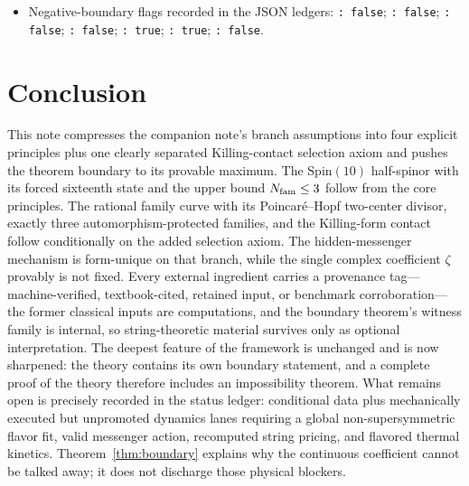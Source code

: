 \documentclass[
  aps,
  prd,
  preprint,
  nofootinbib,
  superscriptaddress,
  longbibliography
]{revtex4-2}
\newcommand{\Spin}{\mathrm{Spin}}
\begin{document}
\begin{itemize}
  ; string-conditional cards
   with ledgers under
  ; collector
   with ledger
  , which
  re-verifies every number in Sec.~\ref{sec:falsifiability} against its
  source ledger.
\item Negative-boundary flags recorded in the JSON ledgers:
  \texttt{: false};
  \texttt{: false};
  \texttt{: false};
  \texttt{: false};
  \texttt{: true};
  \texttt{: true};
  \texttt{: false}.
\end{itemize}

\section{Conclusion}

This note compresses the companion note's branch assumptions into four
explicit principles plus one clearly separated Killing-contact selection
axiom and pushes the theorem boundary to its provable maximum.  The
\(\Spin(10)\) half-spinor with its forced sixteenth state and the upper bound
\(N_{\rm fam}\le3\) follow from the core principles.  The rational family
curve with its Poincar\'e--Hopf two-center divisor, exactly three
automorphism-protected families, and the Killing-form contact follow
conditionally on the added selection axiom.  The hidden-messenger mechanism
is form-unique on that branch, while the single complex coefficient
\(\zeta\) provably is not fixed.  Every external
ingredient carries a provenance tag---machine-verified, textbook-cited,
retained input, or benchmark corroboration---the former classical inputs
are computations, and the boundary theorem's witness family is internal, so
string-theoretic material survives only as optional interpretation.  The
deepest feature of the framework is unchanged and is now sharpened: the
theory contains its own boundary statement, and a complete proof of the
theory therefore includes an impossibility theorem.  What remains open is
precisely recorded in the status ledger: conditional data plus mechanically
executed but unpromoted dynamics lanes requiring a global non-supersymmetric
flavor fit, valid messenger action, recomputed string pricing, and flavored
thermal kinetics.  Theorem~\ref{thm:boundary} explains why the continuous
coefficient cannot be talked away; it does not discharge those physical
blockers.
\end{document}
